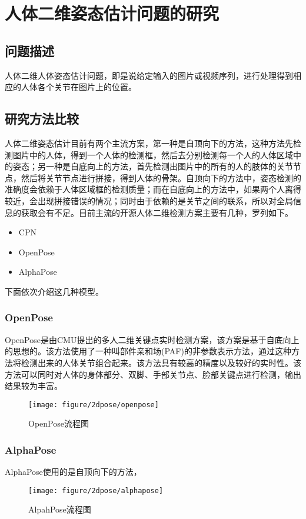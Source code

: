 \section{人体二维姿态估计问题的研究}
\subsection{问题描述}
人体二维人体姿态估计问题，即是说给定输入的图片或视频序列，进行处理得到相应的人体各个关节在图片上的位置。
\subsection{研究方法比较}
人体二维姿态估计目前有两个主流方案，第一种是自顶向下的方法，这种方法先检测图片中的人体，得到一个人体的检测框，然后去分别检测每一个人的人体区域中的姿态；另一种是自底向上的方法，首先检测出图片中的所有的人的肢体的关节节点，然后将关节节点进行拼接，得到人体的骨架。自顶向下的方法中，姿态检测的准确度会依赖于人体区域框的检测质量；而在自底向上的方法中，如果两个人离得较近，会出现拼接错误的情况；同时由于依赖的是关节之间的联系，所以对全局信息的获取会有不足。目前主流的开源人体二维检测方案主要有几种，罗列如下。
\begin{itemize}
    \item CPN 
    \item OpenPose
    \item AlphaPose
\end{itemize}
下面依次介绍这几种模型。
\subsubsection{OpenPose}
OpenPose是由CMU提出的多人二维关键点实时检测方案，该方案是基于自底向上的思想的。该方法使用了一种叫部件亲和场(PAF)的非参数表示方法，通过这种方法将检测出来的人体关节组合起来。该方法具有较高的精度以及较好的实时性。该方法可以同时对人体的身体部分、双脚、手部关节点、脸部关键点进行检测，输出结果较为丰富。
\begin{figure}[H]
    \centering
    \texttt{[image: figure/2dpose/openpose]}
    \caption{\label{fig:2d-op} OpenPose流程图}
\end{figure}

\subsubsection{AlphaPose}
AlphaPose使用的是自顶向下的方法，
\begin{figure}[H]
    \centering
    \texttt{[image: figure/2dpose/alphapose]}
    \caption{\label{fig:2d-ap} AlpahPose流程图}
\end{figure}

